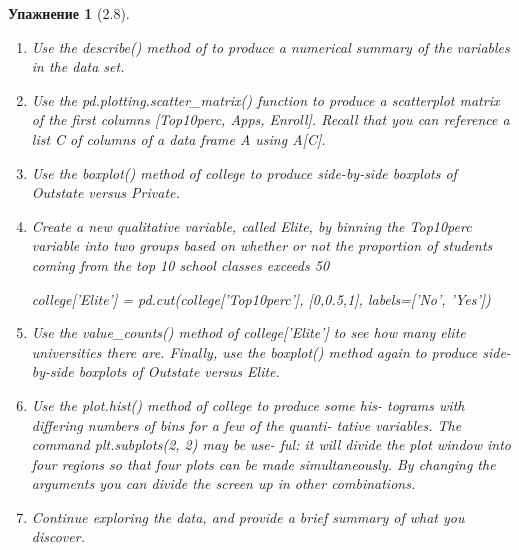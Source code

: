 \documentclass{article}
\newtheorem{exercise}[subsubsection]{Упажнение}
\begin{document}
\begin{exercise}[2.8]
\begin{enumerate}[label=(\alph*)]
		pandas to treat this as data. However, it may be handy to have
		these names for later. Try the following commands and similarly
		look at the resulting data frames:
		\begin{python}[language=Python]
college2 = pd.read_csv('College.csv', index_col=0)
college3 = college.rename({'Unnamed: 0': 'College'},
													axis=1)
college3 = college3.set_index('College')
	\end{python}		
This has used the first column in the file as an index for the
data frame. This means that pandas has given each row a name
corresponding to the appropriate university. Now you should see
that the first data column is Private. Note that the names of
the colleges appear on the left of the table. We also introduced
a new python object above: a dictionary, which is specified by dictionary
(key, value) pairs. Keep your modified version of the data with
the following:
\begin{python}
	college = college3
\end{python}

		\item Use the describe() method of to produce a numerical summary
		of the variables in the data set.
		\item Use the pd.plotting.scatter\_matrix() function to produce a
		scatterplot matrix of the first columns [Top10perc, Apps, Enroll].
		Recall that you can reference a list C of columns of a data frame
		A using A[C].
		\item Use the boxplot() method of college to produce side-by-side
		boxplots of Outstate versus Private.
		\item Create a new qualitative variable, called Elite, by binning the
		Top10perc variable into two groups based on whether or not the
		proportion of students coming from the top 10%
		school classes exceeds 50%
		\begin{python}
college['Elite'] = pd.cut(college['Top10perc'],
[0,0.5,1],
labels=['No', 'Yes'])
		\end{python}
		\item Use the value\_counts() method of college['Elite'] to see how
		many elite universities there are. Finally, use the boxplot() method
		again to produce side-by-side boxplots of Outstate versus Elite.
		\item Use the plot.hist() method of college to produce some his-
		tograms with differing numbers of bins for a few of the quanti-
		tative variables. The command plt.subplots(2, 2) may be use-
		ful: it will divide the plot window into four regions so that four
		plots can be made simultaneously. By changing the arguments
		you can divide the screen up in other combinations.
		\item Continue exploring the data, and provide a brief summary of
		what you discover.		
	\end{enumerate}		
	\end{exercise}
\end{document}
